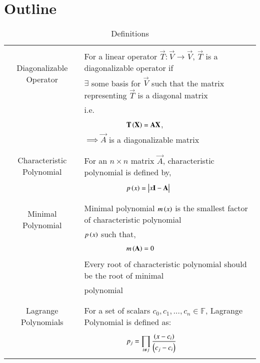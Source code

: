 \documentclass[journal,12pt]{IEEEtran}
\begin{document}
\section{\textbf{Outline}}
\renewcommand{\thetable}{1}
\begin{table}[ht!]
\centering
\begin{tabular}{|c|l|}
    \hline
    \multirow{3}{*}{Diagonalizable Operator} 
	& \\
	& For a linear operator $\vec{T}\colon \vec{V}\longrightarrow \vec{V}$, $\vec{T}$ is a diagonalizable operator if \\
	& $\exists$ some basis for $\Vec{V}$ such that the matrix representing $\vec{T}$ is a diagonal matrix\\
	&i.e.\\
	& $\qquad\qquad\qquad \vec{T}\brak{\vec{X}}=\Vec{A}\Vec{X}$,\\
    &$\implies \vec{A}$ is a diagonalizable matrix\\
	&\\
	\hline
	\multirow{3}{*}{Characteristic Polynomial} 
	& \\
	& For an $n\times n$ matrix $\vec{A}$, characteristic polynomial is defined by,\\
	&\\
	& $\qquad\qquad\qquad p\brak{x}=\mydet{x\Vec{I}-\Vec{A}}$\\
	&\\
	\hline
	\multirow{3}{*}{Minimal Polynomial} 
	&\\
	& Minimal polynomial $m\left(x\right)$ is the smallest factor of characteristic polynomial\\
	& $p\left(x\right)$ such that,\\
	&\\
	& $\qquad \qquad \qquad m\left(\mathbf{A}\right)=0$\\
	& \\
	& Every root of characteristic polynomial should be the root of minimal\\
	& polynomial\\
	&\\
    \hline
	\multirow{3}{*}{Lagrange Polynomials} 
	& \\
	& For a set of scalars $c_0, c_1,\dots, c_n \in \mathbb{F}$, Lagrange Polynomial is defined as:\\
	&\\
	&$\qquad\qquad\qquad p_j=\displaystyle\prod_{i\neq j}\frac{\left(x-c_i\right)}{\left(c_j-c_i\right)}$\\
	&\\
	\hline
\end{tabular}
\label{table:1}
    \caption{Definitions}
\end{table}
\newpage
\end{document}
